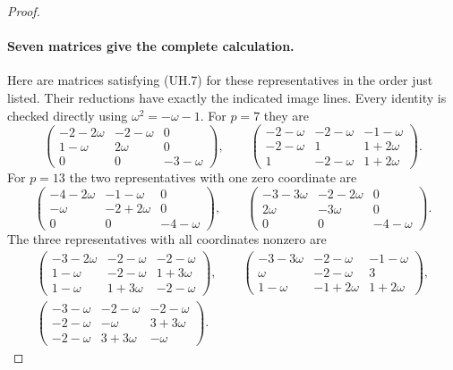 \documentclass[11pt,a4paper]{article}
\theoremstyle{definition}
\begin{document}
\begin{proof}
\paragraph{Seven matrices give the complete calculation.}
Here are matrices satisfying (UH.7) for these representatives in the
order just listed.  Their reductions have exactly the indicated image
lines.  Every identity is checked directly using $\omega^2=-\omega-1$.
For $p=7$ they are
\[
 \begin{pmatrix}
 -2-2\omega&-2-\omega&0\\
 1-\omega&2\omega&0\\
 0&0&-3-\omega
 \end{pmatrix},\qquad
 \begin{pmatrix}
 -2-\omega&-2-\omega&-1-\omega\\
 -2-\omega&1&1+2\omega\\
 1&-2-\omega&1+2\omega
 \end{pmatrix}.
 \tag{UH.10}
\]
For $p=13$ the two representatives with one zero coordinate are
\[
 \begin{pmatrix}
 -4-2\omega&-1-\omega&0\\
 -\omega&-2+2\omega&0\\
 0&0&-4-\omega
 \end{pmatrix},\qquad
 \begin{pmatrix}
 -3-3\omega&-2-2\omega&0\\
 2\omega&-3\omega&0\\
 0&0&-4-\omega
 \end{pmatrix}.
 \tag{UH.11}
\]
The three representatives with all coordinates nonzero are
\begin{gather*}
 \begin{pmatrix}
 -3-2\omega&-2-\omega&-2-\omega\\
 1-\omega&-2-\omega&1+3\omega\\
 1-\omega&1+3\omega&-2-\omega
 \end{pmatrix},\qquad
 \begin{pmatrix}
 -3-3\omega&-2-\omega&-1-\omega\\
 \omega&-2-\omega&3\\
 1-\omega&-1+2\omega&1+2\omega
 \end{pmatrix},\\[3pt]
 \begin{pmatrix}
 -3-\omega&-2-\omega&-2-\omega\\
 -2-\omega&-\omega&3+3\omega\\
 -2-\omega&3+3\omega&-\omega
 \end{pmatrix}.

\end{gather*}
\end{proof}
\end{document}
